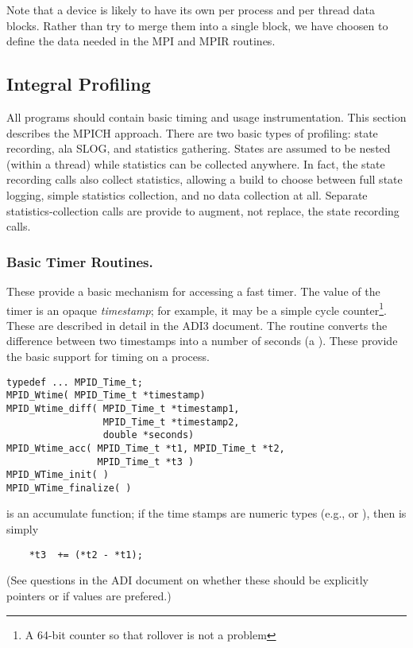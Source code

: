 \documentclass{article}
\begin{document}
Note that a device is likely to have its own per process and per
thread data blocks.  Rather than try to merge them into a single
block, we have choosen to define the data needed in the MPI and MPIR
routines.

\subsection{Integral Profiling}
\label{sec:builtin-timing}
All programs should contain basic timing and usage instrumentation.  This
section describes the MPICH approach.
There are two basic types of profiling: state recording, ala SLOG, and
statistics gathering.  States are assumed to be nested (within a
thread) while statistics can be collected anywhere.  In fact, the
state recording calls also collect statistics, allowing a build to
choose between full state logging, simple statistics collection, and
no data collection at all.  Separate statistics-collection calls are
provide to augment, not replace, the state recording calls.

\subsubsection{Basic Timer Routines.}
These provide a basic mechanism for accessing a fast timer.  The value of the
timer is an opaque \emph{timestamp}; for example, it may be a simple cycle
counter\footnote{A 64-bit counter so that rollover is not a problem}.  These
are described in detail in the ADI3 document. 
The routine  converts the difference
between two timestamps into a number of seconds (a ).  These
provide the basic support for timing on a process.  

\begin{verbatim}
typedef ... MPID_Time_t;
MPID_Wtime( MPID_Time_t *timestamp)
MPID_Wtime_diff( MPID_Time_t *timestamp1, 
                 MPID_Time_t *timestamp2, 
                 double *seconds)
MPID_Wtime_acc( MPID_Time_t *t1, MPID_Time_t *t2, 
                MPID_Time_t *t3 )
MPID_WTime_init( )
MPID_WTime_finalize( )
\end{verbatim}
 is an accumulate function; if the time stamps are numeric
types (e.g.,  or ), then  is
simply
\begin{verbatim}
    *t3  += (*t2 - *t1);
\end{verbatim}
(See questions in the ADI document on whether these should be explicitly
pointers or if values are prefered.)
\end{document}
